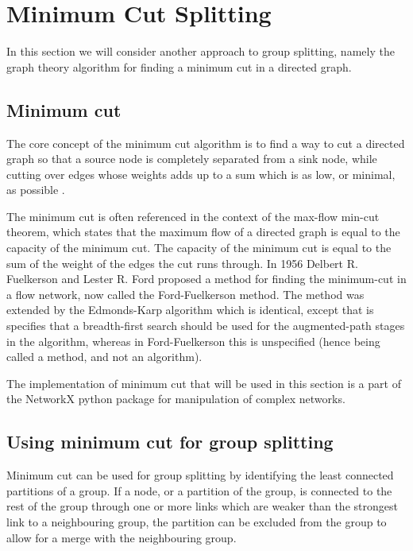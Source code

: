 \section{Minimum Cut Splitting}
\label{chap:mincut}
In this section we will consider another approach to group splitting, namely the graph theory algorithm for finding a minimum cut in a directed graph. 

\subsection{Minimum cut}
The core concept of the minimum cut algorithm is to find a way to cut a directed graph so that a source node is completely separated from a sink node, while cutting over edges 
whose weights adds up to a sum which is as low, or minimal, as possible \cite{chinneck}.

The minimum cut is often referenced in the context of the max-flow min-cut theorem, which states that the maximum flow of a directed graph is equal to the capacity of the minimum cut.
The capacity of the minimum cut is equal to the sum of the weight of the edges the cut runs through. In 1956 Delbert R. Fuelkerson and Lester R.
Ford proposed a method for finding the minimum-cut \cite{ford1956} in a flow network, now called the Ford-Fuelkerson method. The method was extended by the Edmonds-Karp algorithm \cite{Edmonds} which is identical, except that is specifies that a breadth-first search should be used for the augmented-path stages in the algorithm, whereas in Ford-Fuelkerson this is unspecified (hence being called
a method, and not an algorithm).

The implementation of minimum cut that will be used in this section is a part of the NetworkX \cite{NetworkX} python package for manipulation of complex networks.

\subsection{Using minimum cut for group splitting}
Minimum cut can be used for group splitting by identifying the least connected partitions of a group. If a node, or a partition of the group, is connected to the rest of the group
through one or more links which are weaker than the strongest link to a neighbouring group, the partition can be excluded from the group to allow for a merge with the neighbouring group. 


